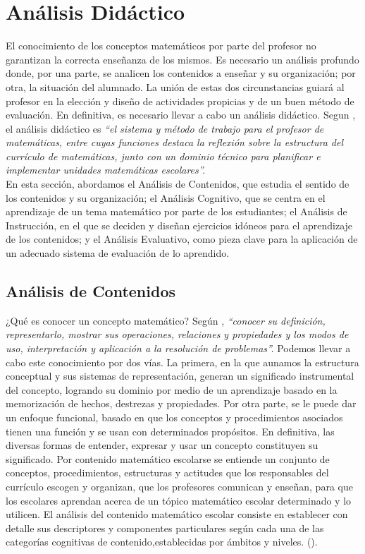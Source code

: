 \documentclass[../main.tex]{memoir}
\begin{document}
\chapter{Análisis Didáctico}
\label{sec:analisis-didactico}

El conocimiento de los conceptos matemáticos por parte del profesor no garantizan la correcta enseñanza de los mismos. Es necesario un análisis profundo donde, por una parte, se analicen los contenidos a enseñar y su organización; por otra, la situación del alumnado. La unión de estas dos circunstancias guiará al profesor en la elección y diseño de actividades propicias y de un buen método de evaluación. En definitiva, es necesario llevar  a cabo un análisis didáctico. Segun \cite{rico2016}, el análisis didáctico es \textit{``el sistema y método de trabajo para el profesor de matemáticas, entre cuyas funciones destaca la reflexión sobre la estructura del currículo de matemáticas, junto con un dominio técnico para planificar e implementar unidades matemáticas escolares''.} \\

En esta sección, abordamos el Análisis de Contenidos, que estudia el sentido de los contenidos y su organización; el Análisis Cognitivo, que se centra en el aprendizaje de un tema matemático por parte de los estudiantes; el Análisis de Instrucción, en el que se deciden y diseñan ejercicios idóneos para el aprendizaje de los contenidos; y el Análisis Evaluativo, como pieza clave para la aplicación de un adecuado sistema de evaluación de lo aprendido.

\section{Análisis de Contenidos}

¿Qué es conocer un concepto matemático? Según \cite{rico2016}, \textit{``conocer su definición, representarlo, mostrar sus operaciones, relaciones y propiedades y los modos de uso, interpretación y aplicación a la resolución de problemas''.} Podemos llevar a cabo este conocimiento por dos vías. La primera, en la que aunamos la estructura conceptual y sus sistemas de representación, generan un significado instrumental del concepto, logrando su dominio por medio de un aprendizaje basado en la memorización de hechos, destrezas y propiedades. Por otra parte, se le puede dar un enfoque funcional, basado en que los conceptos y procedimientos asociados tienen una función y se usan con determinados propósitos. En definitiva, las diversas formas de entender, expresar y usar un concepto constituyen su significado. Por contenido matemático escolarse se entiende un conjunto de conceptos, procedimientos, estructuras y actitudes que los responsables del currículo escogen y organizan, que los profesores comunican y enseñan, para que los escolares aprendan acerca de un tópico matemático escolar determinado y lo utilicen. El análisis del contenido matemático escolar consiste en establecer con detalle sus descriptores y componentes particulares según cada una de las categorías cognitivas de contenido,establecidas por ámbitos y niveles. (\cite{rico2016}). \\
\end{document}
